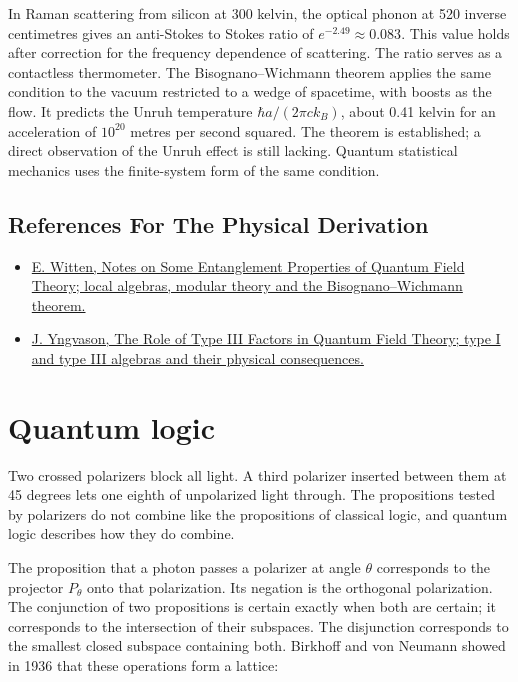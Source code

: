 \documentclass[11pt,oneside]{book}
\begin{document}
In Raman scattering from silicon at 300 kelvin, the optical phonon at 520 inverse centimetres gives an anti-Stokes to Stokes ratio of \(e^{-2.49}\approx0.083\). This value holds after correction for the frequency dependence of scattering. The ratio serves as a contactless thermometer. The Bisognano--Wichmann theorem applies the same condition to the vacuum restricted to a wedge of spacetime, with boosts as the flow. It predicts the Unruh temperature \(\hbar a/(2\pi ck_B)\), about 0.41 kelvin for an acceleration of \(10^{20}\) metres per second squared. The theorem is established; a direct observation of the Unruh effect is still lacking. Quantum statistical mechanics uses the finite-system form of the same condition.

\subsection*{References For The Physical Derivation}
\begin{itemize}
\item \href{https://arxiv.org/abs/1803.04993}{E. Witten, Notes on Some Entanglement Properties of Quantum Field Theory; local algebras, modular theory and the Bisognano--Wichmann theorem.}
\item \href{https://arxiv.org/abs/math-ph/0411058}{J. Yngvason, The Role of Type III Factors in Quantum Field Theory; type I and type III algebras and their physical consequences.}
\end{itemize}





\clearpage

\section{Quantum logic}

\label{topic:quantum-logic}

Two crossed polarizers block all light. A third polarizer inserted between them at 45 degrees lets one eighth of unpolarized light through. The propositions tested by polarizers do not combine like the propositions of classical logic, and quantum logic describes how they do combine.

The proposition that a photon passes a polarizer at angle \(\theta\) corresponds to the projector \(P_\theta\) onto that polarization. Its negation is the orthogonal polarization. The conjunction of two propositions is certain exactly when both are certain; it corresponds to the intersection of their subspaces. The disjunction corresponds to the smallest closed subspace containing both. Birkhoff and von Neumann showed in 1936 that these operations form a lattice:
\end{document}
